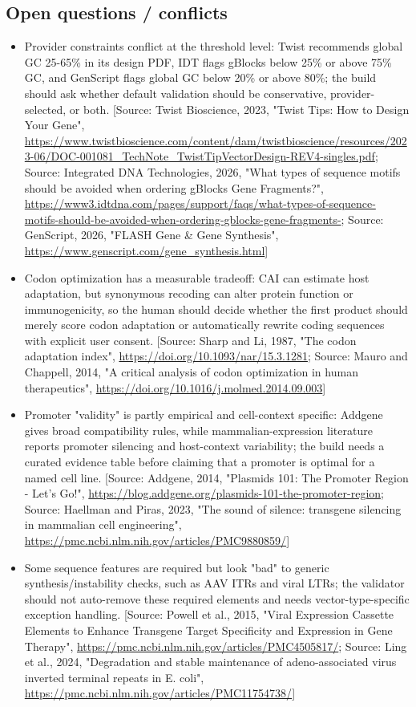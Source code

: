 \documentclass[11pt]{report}
\begin{document}
\subsection{Open questions / conflicts}
\begin{itemize}
\item Provider constraints conflict at the threshold level: Twist recommends global GC 25-65\% in its design PDF, IDT flags gBlocks below 25\% or above 75\% GC, and GenScript flags global GC below 20\% or above 80\%; the build should ask whether default validation should be conservative, provider-selected, or both. [Source: Twist Bioscience, 2023, "Twist Tips: How to Design Your Gene", \url{https://www.twistbioscience.com/content/dam/twistbioscience/resources/2023-06/DOC-001081_TechNote_TwistTipVectorDesign-REV4-singles.pdf}; Source: Integrated DNA Technologies, 2026, "What types of sequence motifs should be avoided when ordering gBlocks Gene Fragments?", \url{https://www3.idtdna.com/pages/support/faqs/what-types-of-sequence-motifs-should-be-avoided-when-ordering-gblocks-gene-fragments-}; Source: GenScript, 2026, "FLASH Gene \& Gene Synthesis", \url{https://www.genscript.com/gene_synthesis.html}]
\item Codon optimization has a measurable tradeoff: CAI can estimate host adaptation, but synonymous recoding can alter protein function or immunogenicity, so the human should decide whether the first product should merely score codon adaptation or automatically rewrite coding sequences with explicit user consent. [Source: Sharp and Li, 1987, "The codon adaptation index", \url{https://doi.org/10.1093/nar/15.3.1281}; Source: Mauro and Chappell, 2014, "A critical analysis of codon optimization in human therapeutics", \url{https://doi.org/10.1016/j.molmed.2014.09.003}]
\item Promoter "validity" is partly empirical and cell-context specific: Addgene gives broad compatibility rules, while mammalian-expression literature reports promoter silencing and host-context variability; the build needs a curated evidence table before claiming that a promoter is optimal for a named cell line. [Source: Addgene, 2014, "Plasmids 101: The Promoter Region - Let's Go!", \url{https://blog.addgene.org/plasmids-101-the-promoter-region}; Source: Haellman and Piras, 2023, "The sound of silence: transgene silencing in mammalian cell engineering", \url{https://pmc.ncbi.nlm.nih.gov/articles/PMC9880859/}]
\item Some sequence features are required but look "bad" to generic synthesis/instability checks, such as AAV ITRs and viral LTRs; the validator should not auto-remove these required elements and needs vector-type-specific exception handling. [Source: Powell et al., 2015, "Viral Expression Cassette Elements to Enhance Transgene Target Specificity and Expression in Gene Therapy", \url{https://pmc.ncbi.nlm.nih.gov/articles/PMC4505817/}; Source: Ling et al., 2024, "Degradation and stable maintenance of adeno-associated virus inverted terminal repeats in E. coli", \url{https://pmc.ncbi.nlm.nih.gov/articles/PMC11754738/}]

\end{itemize}
\end{document}
